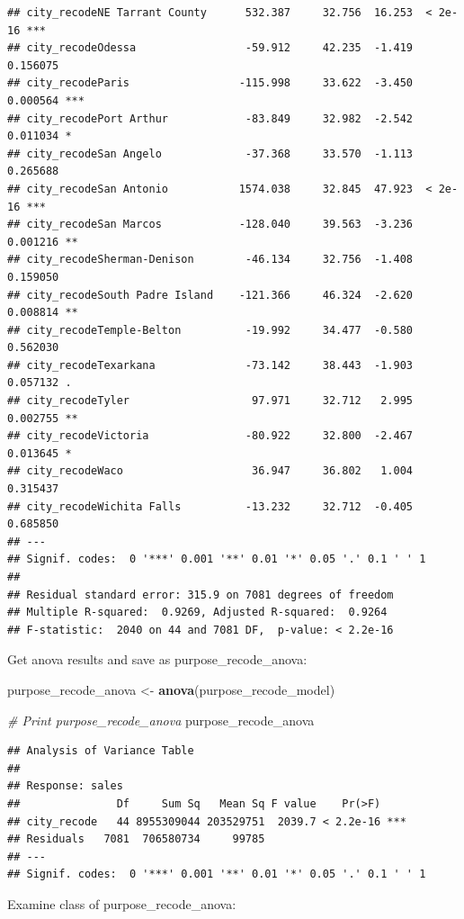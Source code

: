 \documentclass[]{book}
\newenvironment{Shaded}{\begin{snugshade}}{\end{snugshade}}
\newcommand{\CommentTok}[1]{\textcolor[rgb]{0.56,0.35,0.01}{\textit{#1}}}
\newcommand{\KeywordTok}[1]{\textcolor[rgb]{0.13,0.29,0.53}{\textbf{#1}}}
\newcommand{\NormalTok}[1]{#1}
\newcommand{\StringTok}[1]{\textcolor[rgb]{0.31,0.60,0.02}{#1}}
\begin{document}
\begin{verbatim}
## city_recodeNE Tarrant County      532.387     32.756  16.253  < 2e-16 ***
## city_recodeOdessa                 -59.912     42.235  -1.419 0.156075    
## city_recodeParis                 -115.998     33.622  -3.450 0.000564 ***
## city_recodePort Arthur            -83.849     32.982  -2.542 0.011034 *  
## city_recodeSan Angelo             -37.368     33.570  -1.113 0.265688    
## city_recodeSan Antonio           1574.038     32.845  47.923  < 2e-16 ***
## city_recodeSan Marcos            -128.040     39.563  -3.236 0.001216 ** 
## city_recodeSherman-Denison        -46.134     32.756  -1.408 0.159050    
## city_recodeSouth Padre Island    -121.366     46.324  -2.620 0.008814 ** 
## city_recodeTemple-Belton          -19.992     34.477  -0.580 0.562030    
## city_recodeTexarkana              -73.142     38.443  -1.903 0.057132 .  
## city_recodeTyler                   97.971     32.712   2.995 0.002755 ** 
## city_recodeVictoria               -80.922     32.800  -2.467 0.013645 *  
## city_recodeWaco                    36.947     36.802   1.004 0.315437    
## city_recodeWichita Falls          -13.232     32.712  -0.405 0.685850    
## ---
## Signif. codes:  0 '***' 0.001 '**' 0.01 '*' 0.05 '.' 0.1 ' ' 1
## 
## Residual standard error: 315.9 on 7081 degrees of freedom
## Multiple R-squared:  0.9269,	Adjusted R-squared:  0.9264 
## F-statistic:  2040 on 44 and 7081 DF,  p-value: < 2.2e-16
\end{verbatim}

Get anova results and save as purpose\_recode\_anova:

\begin{Shaded}
\begin{Highlighting}[]
\NormalTok{purpose_recode_anova <-}\StringTok{ }\KeywordTok{anova}\NormalTok{(purpose_recode_model)}

\CommentTok{# Print purpose_recode_anova}
\NormalTok{purpose_recode_anova}
\end{Highlighting}
\end{Shaded}

\begin{verbatim}
## Analysis of Variance Table
## 
## Response: sales
##               Df     Sum Sq   Mean Sq F value    Pr(>F)    
## city_recode   44 8955309044 203529751  2039.7 < 2.2e-16 ***
## Residuals   7081  706580734     99785                      
## ---
## Signif. codes:  0 '***' 0.001 '**' 0.01 '*' 0.05 '.' 0.1 ' ' 1
\end{verbatim}

Examine class of purpose\_recode\_anova:
\end{document}
